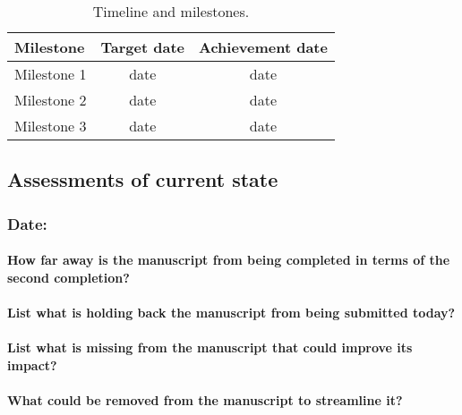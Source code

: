 \documentclass[10pt,letterpaper]{article}
\begin{document}
\begin{description}
\begin{table}[htp] %
\caption{Timeline and milestones.}
\label{tab:timeline}
\begin{center}
\begin{tabular}{lcc}
\toprule
Milestone  & Target date & Achievement date\\
\midrule
Milestone 1                      & date  & date \\
Milestone 2                      & date  & date \\
Milestone 3                      & date  & date  \\ 
\bottomrule
\end{tabular}
\end{center}
\end{table}


\subsection{Assessments of current state}

\subsubsection{Date: }
\paragraph{How far away is the manuscript from being completed in terms of the second completion?}

\paragraph{List what is holding back the manuscript from being submitted today?}

\paragraph{List what is missing from the manuscript that could improve its impact?}

\paragraph{What could be removed from the manuscript to streamline it?}




\end{description}
\end{document}
